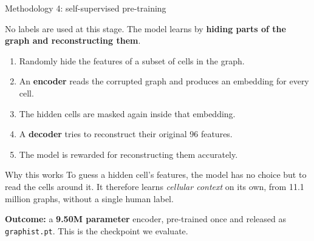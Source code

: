 \documentclass[aspectratio=169,11pt]{beamer}
\newcommand{\hl}[1]{\textcolor{haem}{\textbf{#1}}}
\begin{document}
\begin{frame}{Methodology 4: self-supervised pre-training}

  No labels are used at this stage. The model learns by \textbf{hiding parts of
  the graph and reconstructing them}.

  \vspace{0.5em}
  \begin{enumerate}\small
    \item Randomly hide the features of a subset of cells in the graph.
    \item An \hl{encoder} reads the corrupted graph and produces an embedding for
          every cell.
    \item The hidden cells are masked again inside that embedding.
    \item A \hl{decoder} tries to reconstruct their original 96 features.
    \item The model is rewarded for reconstructing them accurately.
  \end{enumerate}

  \vspace{0.6em}
  \begin{block}{Why this works}
    \small To guess a hidden cell's features, the model has no choice but to read
    the cells around it. It therefore learns \emph{cellular context} on its own,
    from 11.1 million graphs, without a single human label.
  \end{block}

  \vspace{0.3em}
  {\footnotesize \textbf{Outcome:} a \hl{9.50M parameter} encoder, pre-trained
  once and released as \texttt{graphist.pt}. This is the checkpoint we evaluate.}

\end{frame}
\end{document}
